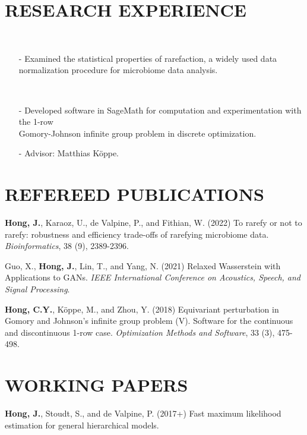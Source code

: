 \documentclass{res}
\begin{document}
\begin{resume}
\section{RESEARCH EXPERIENCE}
     \\ 
\begin{itemize}
        \item[-] Examined the statistical properties of rarefaction, a widely used data normalization procedure for microbiome data analysis.
        \end{itemize}
        
     \\ 
        \begin{itemize}
        \item[-] Developed software in SageMath for computation and experimentation
       with the 1-row \\ Gomory-Johnson infinite group problem in discrete optimization.
       \item[-] Advisor: Matthias K\"{o}ppe.
        \end{itemize}

\section{REFEREED PUBLICATIONS}
\textbf{Hong, J.}, Karaoz, U., de Valpine, P., and Fithian, W. (2022) To rarefy or not to rarefy: robustness and efficiency trade-offs of rarefying microbiome data. \textit{Bioinformatics}, 38 (9), 2389-2396.

Guo, X., \textbf{Hong, J.}, Lin, T., and Yang, N. (2021) Relaxed Wasserstein with Applications to GANs. \textit{IEEE International Conference on Acoustics, Speech, and Signal Processing}.

\textbf{Hong, C.Y.}, K\"{o}ppe, M., and Zhou, Y. (2018) Equivariant perturbation in Gomory and Johnson's infinite group problem (V). Software for the continuous and discontinuous 1-row case. \textit{Optimization Methods and Software}, 33 (3), 475-498.

\section{WORKING PAPERS}
\textbf{Hong, J.}, Stoudt, S., and de Valpine, P. (2017+) Fast maximum likelihood estimation for general hierarchical models.


\end{resume}
\end{document}
